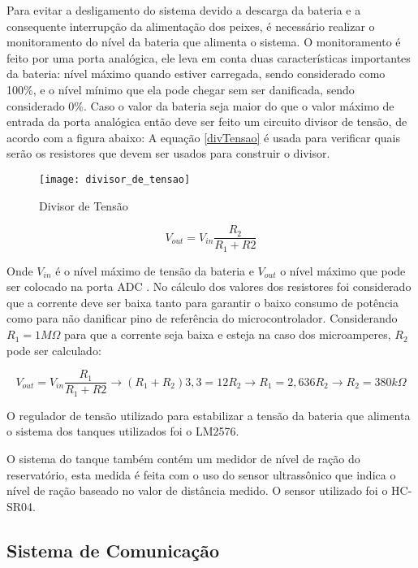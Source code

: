 Para evitar a desligamento do sistema devido a descarga da bateria e a consequente interrupção da alimentação dos peixes, é necessário realizar o monitoramento do nível da bateria que alimenta o sistema. O monitoramento é feito por uma porta analógica, ele leva em conta duas características importantes da bateria: nível máximo quando estiver carregada, sendo considerado como 100\%, e o nível mínimo que ela pode chegar sem ser danificada, sendo considerado 0\%. Caso o valor da bateria seja maior do que o valor máximo de entrada da porta analógica então deve ser feito um circuito divisor de tensão, de acordo com a figura abaixo:
A equação \ref{divTensao} é usada para verificar quais serão os resistores que devem ser usados para construir o divisor.

\begin{figure}[!h]
\centering \texttt{[image: divisor\_de\_tensao]}
\caption{Divisor de Tensão}
\label{divisortensao}
 \end{figure}

\begin{equation}
\label{divTensao}
	V_{out}=V_{in}\frac{R_{2}}{R_{1}+R{2}}
\end{equation}

Onde $V_{in}$ é o nível máximo de tensão da bateria e $V_{out}$ o nível máximo que pode ser colocado na porta ADC \cite{battery}.  No cálculo dos valores dos resistores foi considerado que a corrente deve ser baixa tanto para garantir o baixo consumo de potência como para não danificar pino de referência do microcontrolador. Considerando $R_{1}=1M\Omega$ para que a corrente seja baixa e esteja na caso dos microamperes, $R_{2}$ pode ser calculado:

\begin{equation}
\label{divTensao2}
V_{out}=V_{in}\frac{R_{1}}{R_{1}+R{2}}\rightarrow (R_{1}+R_{2})3,3=12R_{2}\rightarrow R_{1}=2,636R_{2}\rightarrow R_{2}=380k\Omega
\end{equation}

O regulador de tensão utilizado para estabilizar a tensão da bateria que alimenta o sistema dos tanques utilizados foi o LM2576.
\cite{ti:lm2576}

O sistema do tanque também contém um medidor de nível de ração do reservatório, esta medida é feita com o uso do sensor ultrassônico que indica o nível de ração baseado no valor de distância medido. O sensor utilizado foi o HC-SR04.

\subsection{Sistema de Comunicação}

